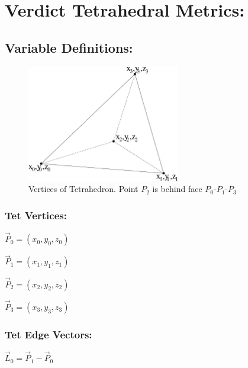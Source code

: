 \documentclass[12pt]{article}
\begin{document}
\section*{Verdict Tetrahedral Metrics:}

\subsection*{Variable Definitions:}

\begin{figure}[htb]
  \begin{center}
    \includegraphics[height=2.0in]{tet.eps}
    \caption{Vertices of Tetrahedron. Point $P_2$ is behind face $P_0$-$P_1$-$P_3$ }
    \label{fig:blank}
  \end{center}
\end{figure}

\subsubsection*{Tet Vertices:}
\begin{center}
$\vec P_0 = (x_0, y_0, z_0)$
\end{center}

\begin{center}
$\vec P_1 = (x_1, y_1, z_1)$
\end{center}

\begin{center}
$\vec P_2 = (x_2, y_2, z_2)$
\end{center}

\begin{center}
$\vec P_3 = (x_3, y_3, z_3)$
\end{center}

\subsubsection*{Tet Edge Vectors:}

\begin{center}
$\vec L_0 = \vec P_1 - \vec P_0 $
\end{center}
\end{document}
